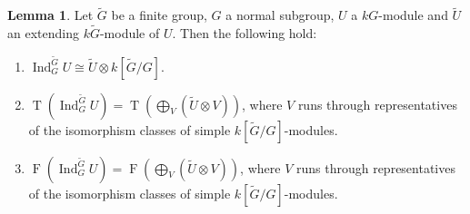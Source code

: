 \documentclass[pdftex,a4paper]{article}
\numberwithin{equation}{subsection}
\theoremstyle{definition}
\newtheorem{lemma}[theorem]{Lemma}
\newtheorem{proposition}[theorem]{Proposition}
\newcommand{\Rad}{{\operatorname{Rad}\nolimits}}
\newcommand{\induc}{{\operatorname{Ind}\nolimits}}
\newcommand{\restr}{{\operatorname{Res}\nolimits}}
\newcommand{\torscl}{\operatorname{\mathrm{T}}}
\newcommand{\torfcl}{\operatorname{\mathrm{F}}}
\begin{document}
\begin{lemma}
	\label{rem ind and extending module 2021-09-29 08:59:16}
	Let \(\tilde{G}\) be a finite group, \(G\) a normal subgroup, \(U\) a \(kG\)-module and \(\tilde{U}\) an extending \(k\tilde{G}\)-module of \(U\).
	Then the following hold:
	\begin{enumerate}
		\item \(\induc_G^{\tilde{G}}U\cong \tilde{U}\otimes k[\tilde{G}/G].\)\label{frob b 2021-10-25 13:13:50}\label{2021-12-06 12:14:15}
		\item \(\torscl(\induc_G^{\tilde{G}}U)=\torscl(\bigoplus_V(\tilde{U}\otimes V))\), where \(V\) runs through representatives of the isomorphism classes of simple \(k[\tilde{G}/G]\)-modules.\label{2021-12-06 12:15:21}
		\item \(\torfcl(\induc_G^{\tilde{G}}U)=\torfcl(\bigoplus_V(\tilde{U}\otimes V))\), where \(V\) runs through representatives of the isomorphism classes of simple \(k[\tilde{G}/G]\)-modules.\label{2021-12-06 12:16:08}
	\end{enumerate}
\end{lemma}
\end{document}
